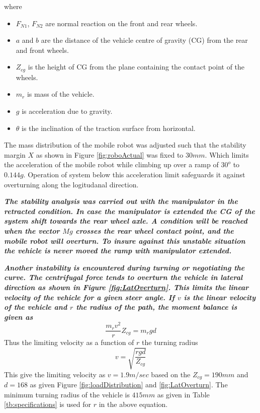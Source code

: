 where 
\begin{itemize}
\item[] $F_{N1}$, $F_{N2}$ are normal reaction on the front and rear wheels.
\item[] $a$ and $b$ are the distance of the vehicle centre of gravity (CG) from the rear and front wheels.
\item [] $Z_{cg}$ is the height of  CG from the  plane containing the contact point of the wheels.
\item [] $m_r$ is mass of the vehicle.
\item [] $g$ is acceleration due to gravity.
\item[] $\theta$ is the inclination of the traction surface from horizontal.
\end{itemize}
The mass distribution of the mobile robot was  adjusted such that the stability margin $X$ as shown in Figure \ref{fig:roboActual} was fixed to $30mm$. Which  limits  the acceleration of the mobile robot while climbing up  over a ramp of $30^o$ to $0.144g$. Operation of system below this acceleration limit safeguards it against overturning along the logitudanal direction. 

\textbf{\textit{The stability analysis was carried out with the manipulator in the retracted condition. In case the manipulator is extended  the CG of the system shift towards the rear wheel axle. A condition will be reached when the vector $Mg$ crosses the rear wheel contact point, and the mobile robot will overturn. To insure against this unstable situation the vehicle is never moved the ramp with manipulator extended.}} 
   
\textbf{\textit{Another instability is encountered during turning or negotiating the curve. The centrifugal force tends to overturn the vehicle in lateral direction as shown in Figure \ref{fig:LatOverturn}. This limits the linear velocity of the vehicle for a given steer angle. If $v$ is the linear velocity of the vehicle and $r$ the radius of the path, the moment balance is given as}}
\begin{equation}
\label{eqn:LatOverturn}
\frac{m_r v^2}{r}Z_{cg}=m_r g d 
\end{equation}
Thus the limiting velocity as a function of $r$ the turning radius
\begin{equation}
\label{eqn:Vel_limit}
v=\sqrt{\frac{rg d}{Z_{cg}}}
\end{equation}
This give the limiting velocity as $v=1.9m/sec$ based on the $Z_{cg}=190mm$ and $d=168$ as given Figure \ref{fig:loadDistribution} and \ref{fig:LatOverturn}. The minimum turning radius of the vehicle is $415mm$ as given in Table \ref{tb:specifications} is used for $r$ in the above equation.

